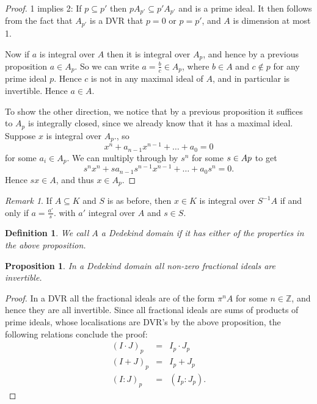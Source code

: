 \documentclass[11pt]{article} %
\newtheorem{defn}{Definition}
\newtheorem{prop}{Proposition}
\theoremstyle{remark}\newtheorem*{rem}{Remark}
\begin{document}
\begin{proof}
 1 implies 2: If $p\subseteq p'$ then $pA_{p'}\subseteq p'A_{p'}$ and is a prime ideal. 
 It then follows from the fact that $A_{p'}$ is a DVR that $p=0$ or $p=p'$, and $A$ is dimension at most 1.
 
Now if $a$ is integral over $A$ then it is integral over $A_p$, and hence by a previous proposition $a\in A_p$.
So we can write $a = \frac{b}{c}\in A_p$, where $b\in A$ and $c\notin p$ for any prime ideal $p$.
Hence $c$ is not in any maximal ideal of $A$, and in particular is invertible.
Hence $a \in A$.

To show the other direction, we notice that by a previous proposition it suffices to $A_p$ is integrally closed, since we already know that it has a maximal ideal.
Suppose $x$ is integral over $A_p$., so 
\[
 x^n + a_{n-1}x^{n-1} + \ldots + a_0 = 0
\]
for some $a_i\in A_p$. 
We can multiply through by $s^n$ for some $s\in A\\p$ to get
\[
 s^nx^n + sa_{n-1}s^{n-1}x^{n-1} + \ldots + a_0s^n = 0.
\]
Hence $sx\in A$, and thus $x\in A_p$.
 \end{proof}
\begin{rem}
 If $A\subseteq K$ and $S$ is as before, then $x\in K$ is integral over $S^{-1}A$ if and only if $a=\frac{a'}{s}$. with $a'$ integral over $A$ and $s\in S$.
\end{rem}

\begin{defn}
 We call $A$ a Dedekind domain if it has either of the properties in the above proposition.
\end{defn}

\begin{prop}
 In a Dedekind domain all non-zero fractional ideals are invertible.
\end{prop}
\begin{proof}
 In a DVR all the fractional ideals are of the form $\pi^nA$ for some $n\in \mathbb Z$, and hence they are all invertible.
 Since all fractional ideals are sums of products of prime ideals, whose localisations are DVR's by the above proposition, the following relations conclude the proof:
 \begin{eqnarray*}
  (I\cdot J)_p & = & I_p\cdot J_p\\
  (I+J)_p & = & I_p + J_p\\
  (I:J)_p & = & (I_p:J_p).
 \end{eqnarray*}
\end{proof}
\end{document}
